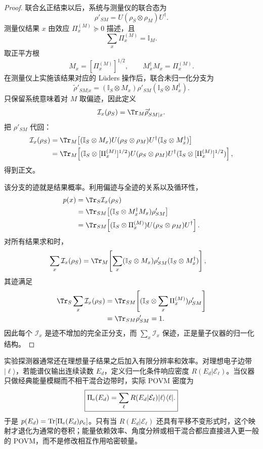 \begin{proof}
联合幺正结束以后，系统与测量仪的联合态为
\[
\rho'_{SM}=U(\rho_S\otimes\rho_M)U^\dagger.
\]
测量仪结果 $x$ 由效应 $\Pi_x^{(M)}\succeq0$ 描述，且
\[
\sum_x\Pi_x^{(M)}=\mathbb I_M.
\]
取正平方根
\[
M_x=[\Pi_x^{(M)}]^{1/2},
\qquad
M_x^\dagger M_x=\Pi_x^{(M)}.
\]
在测量仪上实施该结果对应的 L\"uders 操作后，联合未归一化分支为
\[
\widetilde\rho'_{SM|x}
=(\mathbb I_S\otimes M_x)\rho'_{SM}
(\mathbb I_S\otimes M_x^\dagger).
\]
只保留系统意味着对 $M$ 取偏迹，因此定义
\[
\mathcal I_x(\rho_S)=\Tr_M\widetilde\rho'_{SM|x}.
\]
把 $\rho'_{SM}$ 代回：
\begin{align*}
\mathcal I_x(\rho_S)
&=\Tr_M\!\left[
(\mathbb I_S\otimes M_x)
U(\rho_S\otimes\rho_M)U^\dagger
(\mathbb I_S\otimes M_x^\dagger)
\right]\\
&=\Tr_M\!\left[
(\mathbb I_S\otimes [\Pi_x^{(M)}]^{1/2})
U(\rho_S\otimes\rho_M)U^\dagger
(\mathbb I_S\otimes [\Pi_x^{(M)}]^{1/2})
\right],
\end{align*}
得到正文。

该分支的迹就是结果概率。利用偏迹与全迹的关系以及循环性，
\begin{align*}
p(x)
&=\Tr_S\mathcal I_x(\rho_S)\\
&=\Tr_{SM}\!\left[
(\mathbb I_S\otimes M_x^\dagger M_x)
\rho'_{SM}
\right]\\
&=\Tr_{SM}\!\left[
(\mathbb I_S\otimes\Pi_x^{(M)})
U(\rho_S\otimes\rho_M)U^\dagger
\right].
\end{align*}
对所有结果求和时，
\begin{align*}
\sum_x\mathcal I_x(\rho_S)
&=\Tr_M\!\left[
\sum_x(\mathbb I_S\otimes M_x)
\rho'_{SM}
(\mathbb I_S\otimes M_x^\dagger)
\right],
\end{align*}
其迹满足
\begin{align*}
\Tr_S\sum_x\mathcal I_x(\rho_S)
&=\Tr_{SM}\!\left[
(\mathbb I_S\otimes\sum_x\Pi_x^{(M)})\rho'_{SM}
\right]\\
&=\Tr_{SM}\rho'_{SM}=1.
\end{align*}
因此每个 $\mathcal I_x$ 是迹不增加的完全正分支，而 $\sum_x\mathcal I_x$ 保迹，正是量子仪器的归一化结构。
\end{proof}


实验探测器通常还在理想量子结果之后加入有限分辨率和效率。对理想电子边带 $|\ell\rangle$，若能谱仪输出连续读数 $E_d$，定义归一化条件响应密度 $R(E_d|\mathcal E_\ell)$。当仪器只做经典能量模糊而不相干混合边带时，实际 POVM 密度为
\begin{equation}
\boxed{
\Pi_{\rm e}(E_d)
=\sum_\ell R(E_d|\mathcal E_\ell)|\ell\rangle\langle\ell|.}
\label{eq:electron_detector_response_povm}
\end{equation}
于是 $p(E_d)=\operatorname{Tr}[\Pi_{\rm e}(E_d)\rho_e]$。只有当 $R(E_d|\mathcal E_\ell)$ 还具有平移不变形式时，这个映射才退化为通常的卷积；能量依赖效率、角度分辨或相干混合都应直接进入更一般的 POVM，而不是修改相互作用哈密顿量。

